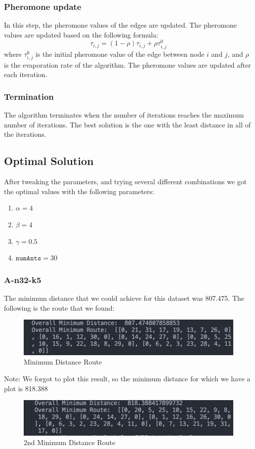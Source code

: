 \documentclass{article}
\begin{document}
\subsubsection{Pheromone update}
In this step, the pheromone values of the edges are updated. The pheromone values are updated based on the following formula:
\begin{equation}
  \tau_{i,j} = (1 - \rho) \tau_{i,j} + \rho \tau_{i,j}^0
\end{equation}
where $\tau_{i,j}^0$ is the initial pheromone value of the edge between node $i$ and $j$, and $\rho$ is the evaporation rate of the algorithm. The pheromone values are updated after each iteration.

\subsubsection{Termination}
The algorithm terminates when the number of iterations reaches the maximum number of iterations. The best solution is the one with the least distance in all of the iterations.

\subsection{Optimal Solution}
After tweaking the parameters, and trying several different combinations we got the optimal values with the following parameters:
\begin{enumerate}
  \item $\alpha = 4$
  \item $\beta = 4$
  \item $\gamma = 0.5$
  \item $\texttt{numAnts} = 30$
\end{enumerate}

\subsubsection{A-n32-k5}
The minimum distance that we could achieve for this dataset was 807.475. The following is the route that we found:
\begin{figure}[H]
  \centering
  \includegraphics[width=1\linewidth]{images/min_dist_n32-k5.jpeg}
  \caption{Minimum Distance Route}
\end{figure}
Note: We forgot to plot this result, so the minimum distance for which we have a plot is 818.388
\begin{figure}[H]
  \centering
  \includegraphics[width=1\linewidth]{images/min_dist2_n32-k5.jpeg}
  \caption{2nd Minimum Distance Route}
\end{figure}
\end{document}
